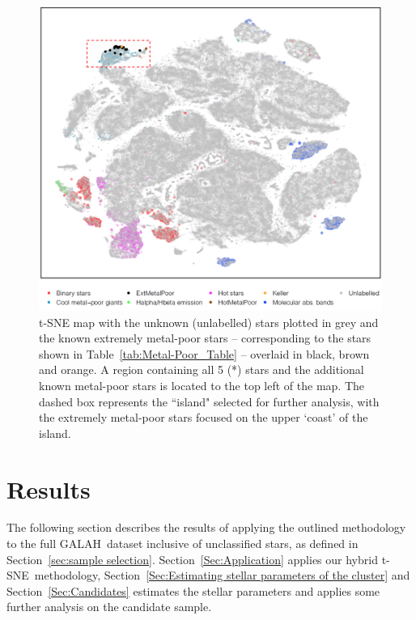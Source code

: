 \documentclass[]{aastex631}
\newcommand{\g}{GALAH\xspace}
\newcommand{\ts}{t-SNE\xspace}
\begin{document}
\begin{figure}
\includegraphics[width=\linewidth,keepaspectratio]{Plots/Figure4.png}
\caption{t-SNE map with the unknown (unlabelled) stars plotted in grey and the known extremely metal-poor stars -- corresponding to the stars shown in Table~\ref{tab:Metal-Poor_Table} -- overlaid in black, brown and orange. A region containing all 5 (*) stars and the additional known metal-poor stars is located to the top left of the map. The dashed box represents the ``island" selected for  further analysis, with the extremely metal-poor stars focused on the upper `coast' of the island.}
\label{fig:tsne_map}
\end{figure}



\section{Results}\label{Sec:Results}

The following section describes the results of applying the outlined methodology to the full \g \ dataset inclusive of unclassified stars, as defined in Section~\ref{sec:sample selection}. Section~\ref{Sec:Application} applies our hybrid \ts \  methodology, Section~\ref{Sec:Estimating stellar parameters of the cluster} and Section~\ref{Sec:Candidates} estimates the stellar parameters and applies some further analysis on the candidate sample.
\end{document}

